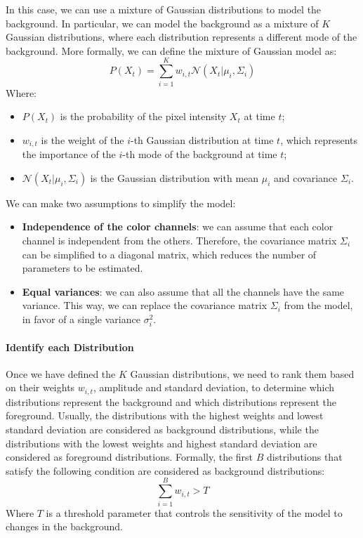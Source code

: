 In this case, we can use a mixture of Gaussian distributions to model the background.
In particular, we can model the background as a mixture of $K$ Gaussian distributions, where each distribution represents a different mode of the background.
More formally, we can define the mixture of Gaussian model as:
\begin{equation}
    P(X_t) = \sum_{i=1}^{K} w_{i,t} \mathcal{N}(X_t | \mu_i, \Sigma_i)
\end{equation}
Where:
\begin{itemize}
    \item $P(X_t)$ is the probability of the pixel intensity $X_t$ at time $t$;
    \item $w_{i,t}$ is the weight of the $i$-th Gaussian distribution at time $t$, which represents the importance of the $i$-th mode of the background at time $t$;
    \item $\mathcal{N}(X_t | \mu_i, \Sigma_i)$ is the Gaussian distribution with mean $\mu_i$ and covariance $\Sigma_i$.
\end{itemize}
We can make two assumptions to simplify the model:
\begin{itemize}
    \item \textbf{Independence of the color channels}: we can assume that each color channel is independent from the others. Therefore,
    the covariance matrix $\Sigma_i$ can be simplified to a diagonal matrix, which reduces the number of parameters to be estimated.
    \item \textbf{Equal variances}: we can also assume that all the channels have the same variance. This way, we can replace the covariance matrix $\Sigma_i$ from the model,
    in favor of a single variance $\sigma_i^2$.
\end{itemize}

\paragraph{Identify each Distribution}
Once we have defined the $K$ Gaussian distributions, we need to rank them based on their weights $w_{i,t}$, amplitude and standard deviation, to determine which distributions represent the background and which distributions represent the foreground.
Usually, the distributions with the highest weights and lowest standard deviation are considered as background distributions, while the distributions with the lowest weights and highest standard deviation are considered as foreground distributions.
Formally, the first $B$ distributions that satisfy the following condition are considered as background distributions:
\begin{equation}
    \sum_{i=1}^{B} w_{i,t} > T
\end{equation}
Where $T$ is a threshold parameter that controls the sensitivity of the model to changes in the background.


